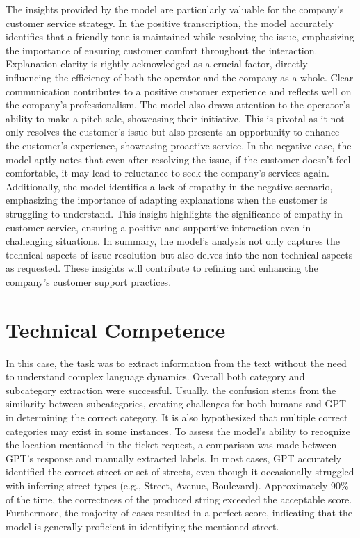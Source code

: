 The insights provided by the model are particularly valuable for the company's customer service strategy. In the positive transcription, the model accurately identifies that a friendly tone is maintained while resolving the issue, emphasizing the importance of ensuring customer comfort throughout the interaction. Explanation clarity is rightly acknowledged as a crucial factor, directly influencing the efficiency of both the operator and the company as a whole. Clear communication contributes to a positive customer experience and reflects well on the company's professionalism. The model also draws attention to the operator's ability to make a pitch sale, showcasing their initiative. This is pivotal as it not only resolves the customer's issue but also presents an opportunity to enhance the customer's experience, showcasing proactive service. In the negative case, the model aptly notes that even after resolving the issue, if the customer doesn't feel comfortable, it may lead to reluctance to seek the company's services again. Additionally, the model identifies a lack of empathy in the negative scenario, emphasizing the importance of adapting explanations when the customer is struggling to understand. This insight highlights the significance of empathy in customer service, ensuring a positive and supportive interaction even in challenging situations. In summary, the model's analysis not only captures the technical aspects of issue resolution but also delves into the non-technical aspects as requested. These insights will contribute to refining and enhancing the company's customer support practices.

\section{Technical Competence}

In this case, the task was to extract information from the text without the need to understand complex language dynamics.
Overall both category and subcategory extraction were successful. Usually, the confusion stems from the similarity between subcategories, creating challenges for both humans and GPT in determining the correct category. It is also hypothesized that multiple correct categories may exist in some instances. To assess the model's ability to recognize the location mentioned in the ticket request, a comparison was made between GPT's response and manually extracted labels. In most cases, GPT accurately identified the correct street or set of streets, even though it occasionally struggled with inferring street types (e.g., Street, Avenue, Boulevard). Approximately 90\% of the time, the correctness of the produced string exceeded the acceptable score. Furthermore, the majority of cases resulted in a perfect score, indicating that the model is generally proficient in identifying the mentioned street.

